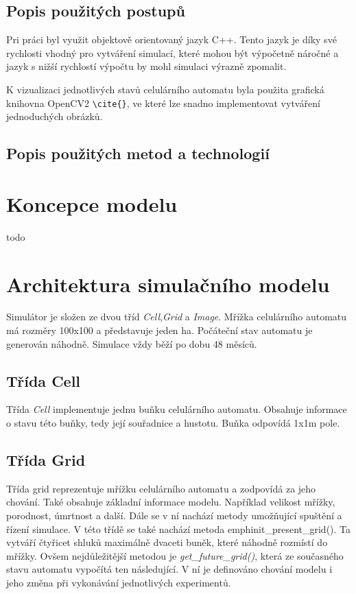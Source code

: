 \documentclass[a4paper,11pt]{article}
\begin{document}
\subsection{Popis použitých postupů}
Pri práci byl využit objektově orientovaný jazyk C++. Tento jazyk je díky své rychlosti vhodný pro vytváření simulací, které mohou být výpočetně náročné a jazyk s nižší rychlostí výpočtu by mohl simulaci výrazně zpomalit.


K vizualizaci jednotlivých stavů celulárního automatu byla použita grafická knihovna OpenCV2 \verb|\cite{}|, ve které lze snadno implementovat vytváření jednoduchých obrázků.

\subsection{Popis použitých metod a technologií}



\section{Koncepce modelu}
todo

\section{Architektura simulačního modelu}
Simulátor je složen ze dvou tříd \emph{Cell},\emph{Grid} a \emph{Image}. Mřížka celulárního automatu má rozměry 100x100 a představuje jeden ha. Počáteční stav automatu je generován náhodně. Simulace vždy běží po dobu 48 měsíců.

\subsection{Třída Cell}
Třída \emph{Cell} implementuje jednu buňku celulárního automatu. Obsahuje informace o stavu této buňky, tedy její souřadnice a hustotu. Buňka odpovídá 1x1m pole.

\subsection{Třída Grid}
Třída grid reprezentuje mřížku celulárního automatu a zodpovídá za jeho chování. Také obsahuje základní informace modelu. Například velikost mřížky, porodnost, úmrtnost a další. Dále se v ní nachází metody umožňující spuštění a řízení simulace. V této třídě se také nachází metoda emph{init\_present\_grid()}. Ta vytváří čtyřicet shluků maximálně dvaceti buněk, které náhodně rozmístí do mřížky.
Ovšem nejdůležitější metodou je \emph{get\_future\_grid()}, která ze současného stavu automatu vypočítá ten následující. V ní je definováno chování modelu i jeho změna při vykonávání jednotlivých experimentů.
\end{document}
